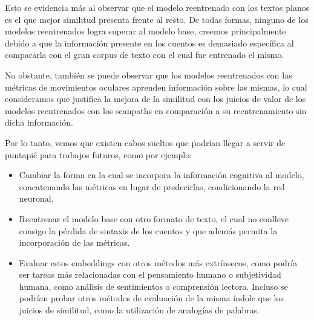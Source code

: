 Esto se evidencia más al observar que el modelo reentrenado con los textos 
planos es el que mejor similitud presenta frente al resto. De todas formas, 
ninguno de los modelos reentrenados logra superar al modelo base, creemos 
principalmente debido a que la información presente en los cuentos es demasiado 
específica al compararla con el gran corpus de texto con el cual fue entrenado el mismo.

No obstante, también se puede observar que los modelos reentrenados con las 
métricas de movimientos oculares aprenden información sobre las mismas, lo 
cual consideramos que justifica la mejora de la similitud con los juicios de 
valor de los modelos reentrenados con los scanpaths en comparación a su 
reentrenamiento sin dicha información.

Por lo tanto, vemos que existen cabos sueltos que podrían llegar a servir 
de puntapié para trabajos futuros, como por ejemplo:

\begin{itemize}
    \item Cambiar la forma en la cual se incorpora la información cognitiva al modelo, 
    concatenando las métricas \parencite{hollenstein2019} en lugar de 
    predecirlas, condicionando la red neuronal.
    \item Reentrenar el modelo base con otro formato de texto, el cual no 
    conlleve consigo la pérdida de sintaxis de los cuentos y que además 
    permita la incorporación de las métricas.
    \item Evaluar estos embeddings con otros métodos más extrínsecos, 
    como podría ser tareas más relacionadas con el pensamiento humano o 
    subjetividad humana, como análisis de sentimientos o comprensión lectora. 
    Incluso se podrían probar otros métodos de evaluación de la misma 
    índole que los juicios de similitud, como la utilización de 
    analogías de palabras. \parencite{Wang_2019}
\end{itemize}
